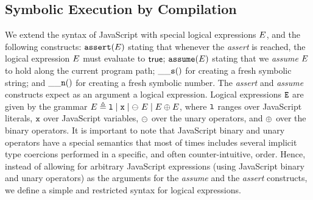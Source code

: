 \subsection{Symbolic Execution by Compilation} 

We extend the syntax of JavaScript with special logical expressions $E$, 
and the following constructs: %
 $\mathtt{assert}(E)$ stating that whenever the \emph{assert} is reached, 
the logical expression $E$ must evaluate to ${\sf true}$; 
 $\mathtt{assume}(E)$ stating that we \emph{assume} $E$ to hold along the
current program path; 
 $\_\_{\mathtt{s}}()$ for creating a fresh symbolic string; and
 $\_\_{\mathtt{n}}()$ for creating a fresh symbolic number. 
The \emph{assert} and \emph{assume} constructs expect as an argument 
a logical expression. 
Logical expressions $\mathtt{E}$ are given by the grammar 
$E \triangleq \mathtt{l} \mid \mathtt{x} \mid \ominus\ E \mid E \oplus E$, 
where $\mathtt{l}$ ranges over JavaScript literals, $\mathtt{x}$ over JavaScript variables, 
$\ominus$ over the \jsil unary operators, and $\oplus$ over the \jsil binary operators.
It is important to note that JavaScript binary and unary operators have a special 
semantics that most of times includes several implicit type coercions performed
in a specific, and often counter-intuitive, order. 
Hence, instead of allowing for arbitrary JavaScript expressions (using JavaScript 
binary and unary operators) as the arguments for the \emph{assume} and 
the \emph{assert} constructs, we define a simple and restricted syntax for logical expressions.

